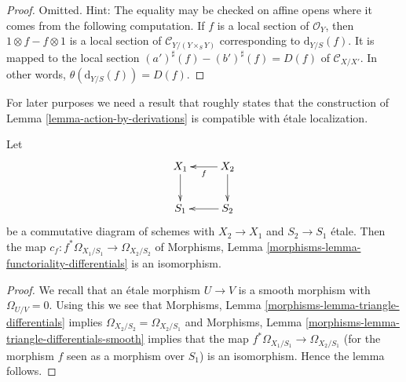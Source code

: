 \begin{proof}
Omitted. Hint: The equality may be checked on affine opens where it
comes from the following computation. If $f$ is a local section of
$\mathcal{O}_Y$, then $1 \otimes f - f \otimes 1$ is a local section
of $\mathcal{C}_{Y/(Y \times_S Y)}$ corresponding to $\text{d}_{Y/S}(f)$.
It is mapped to the local section $(a')^\sharp(f) - (b')^\sharp(f) = D(f)$
of $\mathcal{C}_{X/X'}$. In other words, $\theta(\text{d}_{Y/S}(f)) = D(f)$.
\end{proof}

\noindent
For later purposes we need a result that roughly states that the
construction of
Lemma \ref{lemma-action-by-derivations}
is compatible with \'etale localization.

\begin{lemma}
\label{lemma-sheaf-differentials-etale-localization}
Let
$$
\xymatrix{
X_1 \ar[d] & X_2 \ar[l]^f \ar[d] \\
S_1 & S_2 \ar[l]
}
$$
be a commutative diagram of schemes with $X_2 \to X_1$ and $S_2 \to S_1$
\'etale. Then the map $c_f : f^*\Omega_{X_1/S_1} \to \Omega_{X_2/S_2}$ of
Morphisms, Lemma \ref{morphisms-lemma-functoriality-differentials}
is an isomorphism.
\end{lemma}

\begin{proof}
We recall that an \'etale morphism $U \to V$ is a smooth morphism
with $\Omega_{U/V} = 0$. Using this we see that
Morphisms, Lemma \ref{morphisms-lemma-triangle-differentials}
implies $\Omega_{X_2/S_2} = \Omega_{X_2/S_1}$ and
Morphisms, Lemma \ref{morphisms-lemma-triangle-differentials-smooth}
implies that the map $f^*\Omega_{X_1/S_1} \to \Omega_{X_2/S_1}$
(for the morphism $f$ seen as a morphism over $S_1$)
is an isomorphism. Hence the lemma follows.
\end{proof}

